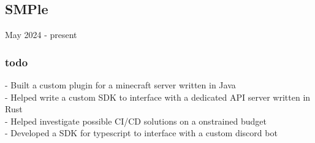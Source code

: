 \subsection{SMPle} May 2024 - present \\
\subsubsection{todo} 
-\:  Built a custom plugin for a minecraft server written in Java \\
-\:  Helped write a custom SDK to interface with a dedicated API server written in Rust \\
-\:  Helped investigate possible CI/CD solutions on a onstrained budget \\
-\:  Developed a SDK for typescript to interface with a custom discord bot \\
